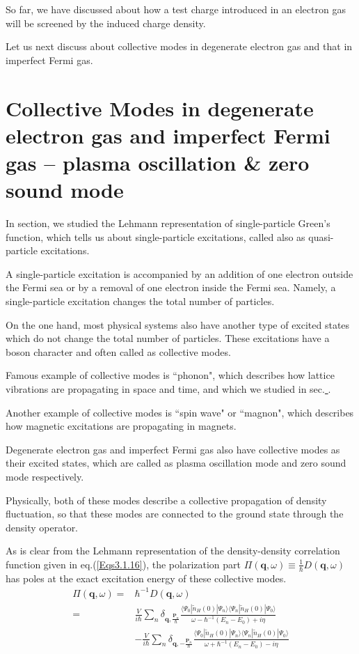 So far, we have discussed about how a test charge introduced in an electron gas will be screened by the induced charge density.

Let us next discuss about collective modes in degenerate electron gas and that in imperfect Fermi gas.

\section[Plasma oscillations and zero sound]{Collective Modes in degenerate electron gas and imperfect Fermi gas -- plasma oscillation \& zero sound mode}

In section, we studied the Lehmann representation of single-particle Green's function, which tells us about single-particle excitations, called also as quasi-particle excitations.

A single-particle excitation is accompanied by an addition of one electron outside the Fermi sea or by a removal of one electron inside the Fermi sea. Namely, a single-particle excitation changes the total number of particles.

On the one hand, most physical systems also have another type of excited states which do not change the total number of particles. These excitations have a boson character and often called as collective modes.

Famous example of collective modes is ``phonon", which describes how lattice vibrations are propagating in space and time, and which we studied in sec.\underline{    }.

Another example of collective modes is ``spin wave" or ``magnon", which describes how magnetic excitations are propagating in magnets.

Degenerate electron gas and imperfect Fermi gas also have collective modes as their excited states, which are called as plasma oscillation mode and zero sound mode respectively.

Physically, both of these modes describe a collective propagation of density fluctuation, so that these modes are connected to the ground state through the density operator.

As is clear from the Lehmann representation of the density-density correlation function given in eq.(\ref{Eqs3.1.16}), the polarization part $\Pi(\mathbf{q},\omega) \equiv \frac{1}{\hbar}D(\mathbf{q},\omega)$ has poles at the exact excitation energy of these collective modes.
\begin{equation*} \tag{3.1.16'} \begin{split}
\Pi(\mathbf{q},\omega)=& \hbar^{-1} D(\mathbf{q},\omega)\\
=& \frac{V}{i \hbar} \sum_n \delta_{\mathbf{q},\frac{\mathbf{P}_n}{\hbar}}\frac{\langle \Psi_0 | \tilde{n}_H(0) | \Psi_n \rangle \langle \Psi_n | \tilde{n}_H(0) | \Psi_0 \rangle}{ \omega - \hbar^{-1}(E_n-E_0) + i \eta}\\
& -\frac{V}{i \hbar} \sum_n \delta_{\mathbf{q},-\frac{\mathbf{P}_n}{\hbar}}\frac{\langle \Psi_0 | \tilde{n}_H(0) | \Psi_n \rangle \langle \Psi_n | \tilde{n}_H(0) | \Psi_0 \rangle}{ \omega + \hbar^{-1}(E_n-E_0) - i \eta}
\end{split} \end{equation*}

